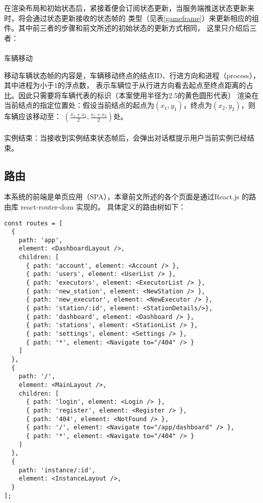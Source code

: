 在渲染布局和初始状态后，紧接着便会订阅状态更新，当服务端推送状态更新来时，将会通过状态更新接收的状态帧的
类型（见表\ref{gameframe}）来更新相应的组件。其中前三者的步骤和前文所述的初始状态的更新方式相同，
这里只介绍后三者：

\paragraph{} 车辆移动

移动车辆状态帧的内容是，车辆移动终点的结点ID、行进方向和进程（process），其中进程为小于1的浮点数，
表示车辆位于从行进方向看去起点至终点距离的占比。因此只需要将车辆代表的标识（本案使用半径为2.5的黄色圆形代表）
渲染在当前结点的指定位置处：假设当前结点的起点为$(x_1, y_1)$，终点为$(x_2, y_2)$，则车辆应该移动至：
$\displaystyle(\frac{x_1 + x_2}{2}, \frac{x_1 + x_2}{2})$处。

\paragraph{} 实例结束：当接收到实例结束状态帧后，会弹出对话框提示用户当前实例已经结束。

\subsection{路由}

本系统的前端是单页应用（SPA），本章前文所述的各个页面是通过React.js 的路由库 react-router-dom 实现的。
具体定义的路由树如下：

\begin{lstlisting}
const routes = [
  {
    path: 'app',
    element: <DashboardLayout />,
    children: [
      { path: 'account', element: <Account /> },
      { path: 'users', element: <UserList /> },
      { path: 'executors', element: <ExecutorList /> },
      { path: 'new_station', element: <NewStation /> },
      { path: 'new_executor', element: <NewExecutor /> },
      { path: 'station/:id', element: <StationDetails/>},
      { path: 'dashboard', element: <Dashboard /> },
      { path: 'stations', element: <StationList /> },
      { path: 'settings', element: <Settings /> },
      { path: '*', element: <Navigate to="/404" /> }
    ]
  },
  {
    path: '/',
    element: <MainLayout />,
    children: [
      { path: 'login', element: <Login /> },
      { path: 'register', element: <Register /> },
      { path: '404', element: <NotFound /> },
      { path: '/', element: <Navigate to="/app/dashboard" /> },
      { path: '*', element: <Navigate to="/404" /> }
    ]
  },
  {
    path: 'instance/:id',
    element: <InstanceLayout />,
  }
];
\end{lstlisting}